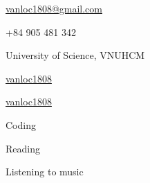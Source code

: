 \documentclass[11pt]{spidercv}
\begin{document}
    \begin{TopBar}{\ColorTextSide}

        \begin{DoubleColumns}
            \begin{ItemList}{\ColorHighlight}
                \item [\Large\faAt] \href{mailto:vanloc1808@gmail.com}{vanloc1808@gmail.com}
                \item [\Large\faMobile] +84 905 481 342
                \item [\Large\faMapMarker] University of Science, VNUHCM
            \end{ItemList}
            \nextcolumn
            \begin{ItemList}{\ColorHighlight}
                \item [\Large\faGithub] \href{https://github.com/vanloc1808}{vanloc1808}
                \item [\Large\faLinkedinSquare] \href{https://www.linkedin.com/in/vanloc1808/}{vanloc1808}
            \end{ItemList}
        \end{DoubleColumns}

        \begin{TripleColumns}
            \begin{ItemList}{\ColorHighlight}
                \item [] Coding
            \end{ItemList}
            \nextcolumn
            \begin{ItemList}{\ColorHighlight}
                \item [] Reading
            \end{ItemList}
            \nextcolumn
            \begin{ItemList}{\ColorHighlight}
                \item [] Listening to music
            \end{ItemList}
        \end{TripleColumns}
    \end{TopBar}
\end{document}

